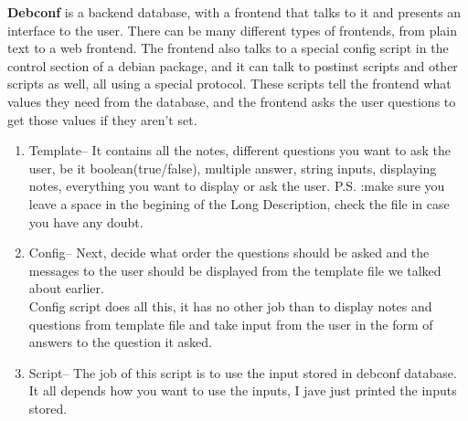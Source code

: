 {\bf Debconf} is a backend database, with a frontend that talks to it and presents an interface to the user. There can be many different types of frontends, from plain text to a web frontend. The frontend also talks to a special config script in the control section of a debian package, and it can talk to postinst scripts and other scripts as well, all using a special protocol. These scripts tell the frontend what values they need from the database, and the frontend asks the user questions to get those values if they aren't set. 
\begin{enumerate}
\item Template-- It contains all the notes, different questions you want to ask the user, be it boolean(true/false), multiple answer, string inputs, displaying notes, everything you want to display or ask the user. 
P.S. :make sure you leave a space in the begining of the Long Description, check the file in case you have any doubt. 
\item Config-- Next, decide what order the questions should be asked and the messages to the user should be displayed from the template file we talked about earlier.\\
Config script does all this, it has no other job than to display notes and questions from template file and take input from the user in the form of answers to the question it asked. 
\item Script-- The job of this script is to use the input stored in debconf database. It all depends how you want to use the inputs, I jave just printed the inputs stored. 
\end{enumerate}

